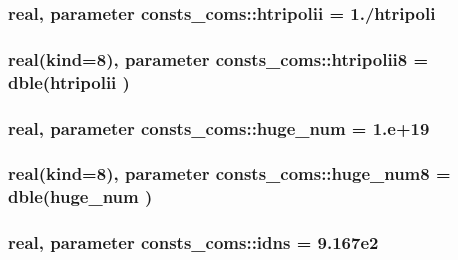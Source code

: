 \subsubsection[{\texorpdfstring{htripolii}{htripolii}}]{\setlength{\rightskip}{0pt plus 5cm}real, parameter consts\+\_\+coms\+::htripolii = 1./{\bf htripoli}}\hypertarget{namespaceconsts__coms_a5d4d8f013ab8c773c7a3c4417e67af03}{}\label{namespaceconsts__coms_a5d4d8f013ab8c773c7a3c4417e67af03}
\subsubsection[{\texorpdfstring{htripolii8}{htripolii8}}]{\setlength{\rightskip}{0pt plus 5cm}real(kind=8), parameter consts\+\_\+coms\+::htripolii8 = dble({\bf htripolii} )}\hypertarget{namespaceconsts__coms_a499d4c550c8f8a5e4f942f7def28d7cf}{}\label{namespaceconsts__coms_a499d4c550c8f8a5e4f942f7def28d7cf}
\subsubsection[{\texorpdfstring{huge\+\_\+num}{huge_num}}]{\setlength{\rightskip}{0pt plus 5cm}real, parameter consts\+\_\+coms\+::huge\+\_\+num = 1.e+19}\hypertarget{namespaceconsts__coms_a6a5c10fb375429bb6cbc12bb37617f31}{}\label{namespaceconsts__coms_a6a5c10fb375429bb6cbc12bb37617f31}
\subsubsection[{\texorpdfstring{huge\+\_\+num8}{huge_num8}}]{\setlength{\rightskip}{0pt plus 5cm}real(kind=8), parameter consts\+\_\+coms\+::huge\+\_\+num8 = dble({\bf huge\+\_\+num} )}\hypertarget{namespaceconsts__coms_ade7c97415ddfe86606e259317e709e8b}{}\label{namespaceconsts__coms_ade7c97415ddfe86606e259317e709e8b}
\subsubsection[{\texorpdfstring{idns}{idns}}]{\setlength{\rightskip}{0pt plus 5cm}real, parameter consts\+\_\+coms\+::idns = 9.\+167e2}\hypertarget{namespaceconsts__coms_aa7a06b5486b2b3e17aeb2bb7b0318e11}{}\label{namespaceconsts__coms_aa7a06b5486b2b3e17aeb2bb7b0318e11}
